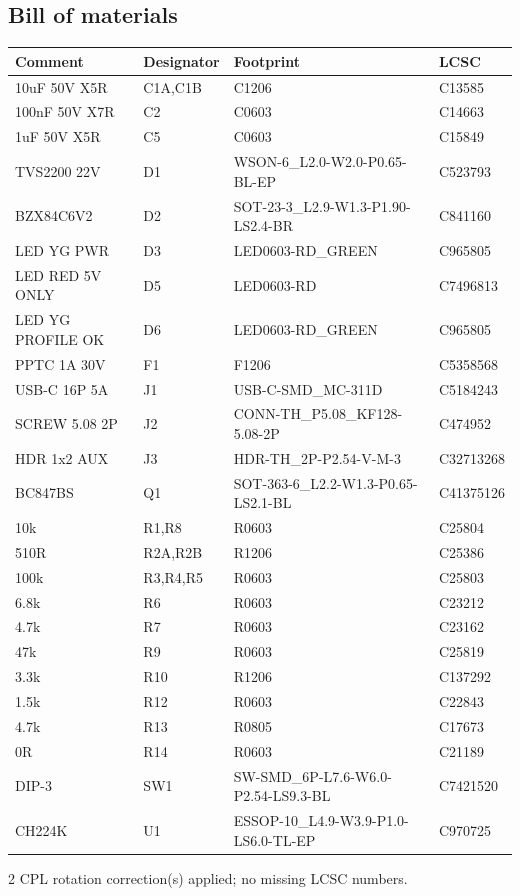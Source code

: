 \documentclass[11pt,a4paper]{article}
\begin{document}
\subsection*{Bill of materials}
{\small
\begin{longtable}{p{4.4cm}p{2.8cm}p{4.6cm}l}
\toprule
\textbf{Comment} & \textbf{Designator} & \textbf{Footprint} & \textbf{LCSC} \\
\midrule
\endhead
10uF 50V X5R & C1A,C1B & C1206 & C13585 \\
100nF 50V X7R & C2 & C0603 & C14663 \\
1uF 50V X5R & C5 & C0603 & C15849 \\
TVS2200 22V & D1 & WSON-6\_L2.0-W2.0-P0.65-BL-EP & C523793 \\
BZX84C6V2 & D2 & SOT-23-3\_L2.9-W1.3-P1.90-LS2.4-BR & C841160 \\
LED YG PWR & D3 & LED0603-RD\_GREEN & C965805 \\
LED RED 5V ONLY & D5 & LED0603-RD & C7496813 \\
LED YG PROFILE OK & D6 & LED0603-RD\_GREEN & C965805 \\
PPTC 1A 30V & F1 & F1206 & C5358568 \\
USB-C 16P 5A & J1 & USB-C-SMD\_MC-311D & C5184243 \\
SCREW 5.08 2P & J2 & CONN-TH\_P5.08\_KF128-5.08-2P & C474952 \\
HDR 1x2 AUX & J3 & HDR-TH\_2P-P2.54-V-M-3 & C32713268 \\
BC847BS & Q1 & SOT-363-6\_L2.2-W1.3-P0.65-LS2.1-BL & C41375126 \\
10k & R1,R8 & R0603 & C25804 \\
510R & R2A,R2B & R1206 & C25386 \\
100k & R3,R4,R5 & R0603 & C25803 \\
6.8k & R6 & R0603 & C23212 \\
4.7k & R7 & R0603 & C23162 \\
47k & R9 & R0603 & C25819 \\
3.3k & R10 & R1206 & C137292 \\
1.5k & R12 & R0603 & C22843 \\
4.7k & R13 & R0805 & C17673 \\
0R & R14 & R0603 & C21189 \\
DIP-3 & SW1 & SW-SMD\_6P-L7.6-W6.0-P2.54-LS9.3-BL & C7421520 \\
CH224K & U1 & ESSOP-10\_L4.9-W3.9-P1.0-LS6.0-TL-EP & C970725 \\
\bottomrule
\end{longtable}
}
2 CPL rotation correction(s) applied; no missing LCSC numbers.
\end{document}
